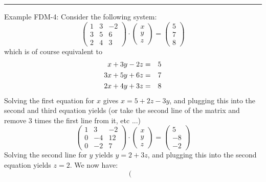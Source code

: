 \begin{center}
\begin{minipage}[t]{0.77\textwidth}
\par\noindent\rule{\textwidth}{0.4pt}
{\color{blue} Example FDM-4}:
Consider the following system:
\begin{equation}
\left(
\begin{array}{ccc}
1 & 3 & -2 \\
3 & 5 & 6 \\
2 & 4 & 3
\end{array}
\right)
\cdot
\left(
\begin{array}{c}
x \\ y \\ z
\end{array}
\right)
=
\left(
\begin{array}{c}
5 \\ 7 \\ 8
\end{array}
\right)
\end{equation}
which is of course equivalent to
\begin{eqnarray}
x+3y-2z &=& 5 \nonumber\\
3x+5y+6z &=& 7 \nonumber\\
2x+4y+3z &=& 8 
\end{eqnarray}
Solving the first equation for $x$ gives $x = 5 + 2z - 3y$, 
and plugging this into the second and third equation yields
(or take the second line of the matrix and remove 3 times the 
first line from it, etc ...)
\begin{equation}
\left(
\begin{array}{ccc}
1 & 3 & -2 \\
0 & -4 & 12 \\
0 & -2 & 7
\end{array}
\right)
\cdot
\left(
\begin{array}{c}
x \\ y \\ z
\end{array}
\right)
=
\left(
\begin{array}{c}
5 \\ -8 \\ -2 
\end{array}
\right)
\end{equation}
Solving the second line for $y$ yields $y = 2 + 3z$, 
and plugging this into the second equation yields $z = 2$. We now have: 
\begin{equation}
\left(
\begin{array}{ccc}

\end{array}
\end{equation}
\end{minipage}
\end{center}

